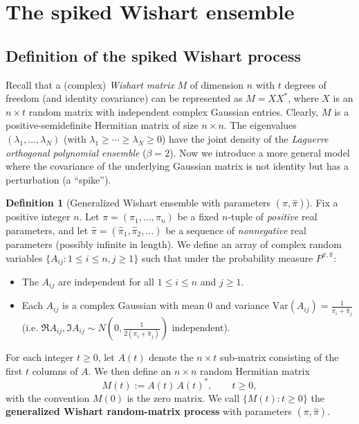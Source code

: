 \documentclass[letterpaper,11pt,oneside,reqno]{article}
\numberwithin{equation}{section}
\theoremstyle{definition}
\newtheorem{definition}[proposition]{Definition}
\begin{document}
\section{The spiked Wishart ensemble}
\label{sec:Wishart}

\subsection{Definition of the spiked Wishart process}
\label{sub:Wishart_process}

Recall that a (complex) \emph{Wishart matrix} $M$ of dimension
$n$ with $t$ degrees of freedom (and identity covariance)
can be represented as $M = X X^*$, where $X$ is an $n\times
t$ random matrix with independent complex Gaussian entries.
Clearly, $M$ is a positive-semidefinite Hermitian matrix of
size $n\times n$. The eigenvalues
$(\lambda_1,\dots,\lambda_N)$ (with $\lambda_1\ge \cdots \ge
\lambda_N \ge 0$) have the joint density of the
\emph{Laguerre orthogonal polynomial ensemble} ($\beta=2$).
Now we introduce a more
general model where the covariance of the underlying
Gaussian matrix is not identity but has a
perturbation (a ``spike'').

\begin{definition}[Generalized Wishart ensemble with parameters $(\pi,\hat\pi)$]\label{def:Wishart}
Fix a positive integer $n$. Let $\pi=(\pi_1,\dots,\pi_n)$ be a fixed $n$-tuple of \emph{positive} real parameters, and let $\hat\pi = (\hat\pi_1,\hat\pi_2,\dots)$ be a sequence of \emph{nonnegative} real parameters (possibly infinite in length). We define an array of complex random variables $\{A_{ij}: 1\le i\le n, j\ge 1\}$ such that under the probability measure $P^{\pi,\hat\pi}$:
\begin{itemize}\item The $A_{ij}$ are independent for all $1\le i\le n$ and $j\ge 1$.
\item Each $A_{ij}$ is a complex Gaussian with mean $0$ and variance $\mathrm{Var}(A_{ij}) = \frac{1}{\pi_i + \hat\pi_j}$ (i.e. $\Re A_{ij}, \Im A_{ij} \sim N(0,\frac{1}{2(\pi_i+\hat\pi_j)})$ independent).
\end{itemize}
For each integer $t\ge 0$, let $A(t)$ denote the $n\times t$ sub-matrix consisting of the first $t$ columns of $A$. We then define an $n\times n$ random Hermitian matrix
\[ M(t) := A(t)\,A(t)^*, \qquad t\ge 0, \]
with the convention $M(0)$ is the zero matrix. We call $\{M(t): t\ge 0\}$ the \textbf{generalized Wishart random-matrix process} with parameters $(\pi,\hat\pi)$.
\end{definition}
\end{document}
